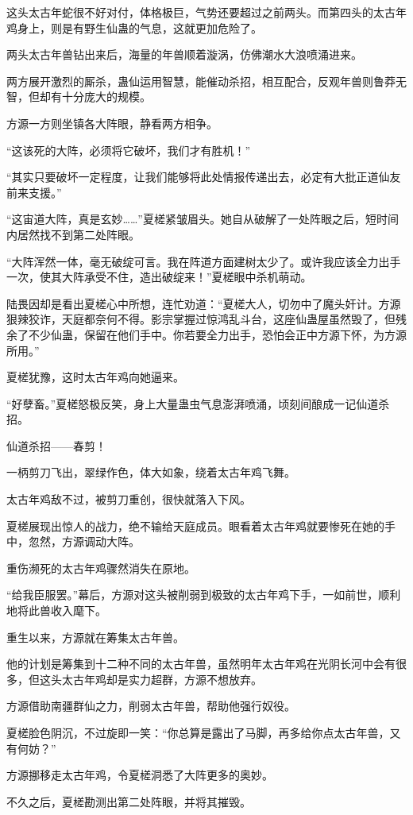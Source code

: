 \begin{this_body}
这头太古年蛇很不好对付，体格极巨，气势还要超过之前两头。而第四头的太古年鸡身上，则是有野生仙蛊的气息，这就更加危险了。

两头太古年兽钻出来后，海量的年兽顺着漩涡，仿佛潮水大浪喷涌进来。

两方展开激烈的厮杀，蛊仙运用智慧，能催动杀招，相互配合，反观年兽则鲁莽无智，但却有十分庞大的规模。

方源一方则坐镇各大阵眼，静看两方相争。

“这该死的大阵，必须将它破坏，我们才有胜机！”

“其实只要破坏一定程度，让我们能够将此处情报传递出去，必定有大批正道仙友前来支援。”

“这宙道大阵，真是玄妙……”夏槎紧皱眉头。她自从破解了一处阵眼之后，短时间内居然找不到第二处阵眼。

“大阵浑然一体，毫无破绽可言。我在阵道方面建树太少了。或许我应该全力出手一次，使其大阵承受不住，造出破绽来！”夏槎眼中杀机萌动。

陆畏因却是看出夏槎心中所想，连忙劝道：“夏槎大人，切勿中了魔头奸计。方源狠辣狡诈，天庭都奈何不得。影宗掌握过惊鸿乱斗台，这座仙蛊屋虽然毁了，但残余了不少仙蛊，保留在他们手中。你若要全力出手，恐怕会正中方源下怀，为方源所用。”

夏槎犹豫，这时太古年鸡向她逼来。

“好孽畜。”夏槎怒极反笑，身上大量蛊虫气息澎湃喷涌，顷刻间酿成一记仙道杀招。

仙道杀招——春剪！

一柄剪刀飞出，翠绿作色，体大如象，绕着太古年鸡飞舞。

太古年鸡敌不过，被剪刀重创，很快就落入下风。

夏槎展现出惊人的战力，绝不输给天庭成员。眼看着太古年鸡就要惨死在她的手中，忽然，方源调动大阵。

重伤濒死的太古年鸡骤然消失在原地。

“给我臣服罢。”幕后，方源对这头被削弱到极致的太古年鸡下手，一如前世，顺利地将此兽收入麾下。

重生以来，方源就在筹集太古年兽。

他的计划是筹集到十二种不同的太古年兽，虽然明年太古年鸡在光阴长河中会有很多，但这头太古年鸡却是实力超群，方源不想放弃。

方源借助南疆群仙之力，削弱太古年兽，帮助他强行奴役。

夏槎脸色阴沉，不过旋即一笑：“你总算是露出了马脚，再多给你点太古年兽，又有何妨？”

方源挪移走太古年鸡，令夏槎洞悉了大阵更多的奥妙。

不久之后，夏槎勘测出第二处阵眼，并将其摧毁。


\end{this_body}

